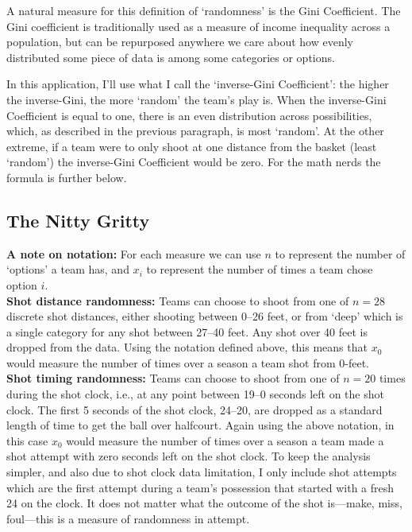 \documentclass[a4paper, 11pt]{article}
\begin{document}
A natural measure for this definition of `randomness' is the Gini Coefficient. The Gini coefficient is traditionally used as a measure of income inequality across a population, but can be repurposed anywhere we care about how evenly distributed some piece of data is among some categories or options.

In this application, I'll use what I call the `inverse-Gini Coefficient': the higher the inverse-Gini, the more `random' the team's play is. When the inverse-Gini Coefficient is equal to one, there is an even distribution across possibilities, which, as described in the previous paragraph, is most `random'. At the other extreme, if a team were to only shoot at one distance from the basket (least `random') the inverse-Gini Coefficient would be zero. For the math nerds the formula is further below. %

\subsection*{The Nitty Gritty}
\noindent\textbf{A note on notation:} For each measure we can use $n$ to represent the number of `options' a team has, and $x_i$ to represent the number of times a team chose option $i$.\\

\noindent \textbf{Shot distance randomness:} Teams can choose to shoot from one of $n=28$ discrete shot distances, either shooting between 0--26 feet, or from `deep' which is a single category for any shot between 27--40 feet. Any shot over 40 feet is dropped from the data. Using the notation defined above, this means that $x_0$ would measure the number of times over a season a team shot from 0-feet.\\

\noindent\textbf{Shot timing randomness:} Teams can choose to shoot from one of $n=20$ times during the shot clock, i.e., at any point between 19--0 seconds left on the shot clock. The first 5 seconds of the shot clock, 24--20, are dropped as a standard length of time to get the ball over halfcourt. Again using the above notation, in this case $x_0$ would measure the number of times over a season a team made a shot attempt with zero seconds left on the shot clock. To keep the analysis simpler, and also due to shot clock data limitation, I only include shot attempts which are the first attempt during a team's possession that started with a fresh 24 on the clock. It does not matter what the outcome of the shot is---make, miss, foul---this is a measure of randomness in attempt.\\
\end{document}
